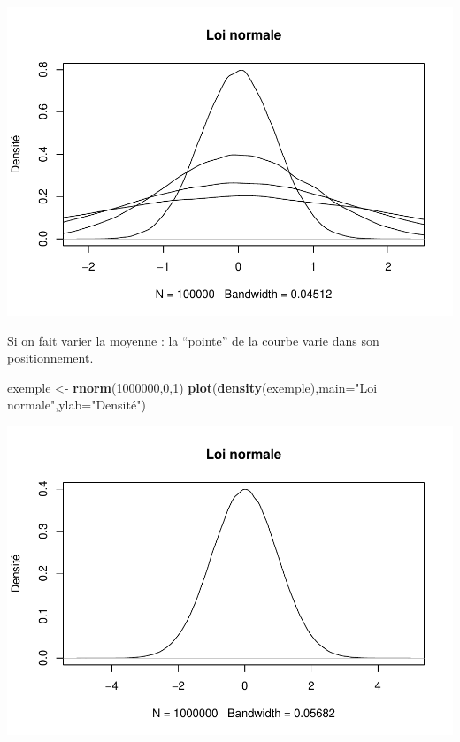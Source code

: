 \documentclass[
]{book}
\newenvironment{Shaded}{\begin{snugshade}}{\end{snugshade}}
\newcommand{\AttributeTok}[1]{\textcolor[rgb]{0.13,0.29,0.53}{#1}}
\newcommand{\DecValTok}[1]{\textcolor[rgb]{0.00,0.00,0.81}{#1}}
\newcommand{\FunctionTok}[1]{\textcolor[rgb]{0.13,0.29,0.53}{\textbf{#1}}}
\newcommand{\NormalTok}[1]{#1}
\newcommand{\OtherTok}[1]{\textcolor[rgb]{0.56,0.35,0.01}{#1}}
\newcommand{\StringTok}[1]{\textcolor[rgb]{0.31,0.60,0.02}{#1}}
\begin{document}
\includegraphics{_main_files/figure-latex/unnamed-chunk-4-1.pdf}

Si on fait varier la moyenne : la ``pointe'' de la courbe varie dans son
positionnement.

\begin{Shaded}
\begin{Highlighting}[]
\NormalTok{exemple }\OtherTok{\textless{}{-}} \FunctionTok{rnorm}\NormalTok{(}\DecValTok{1000000}\NormalTok{,}\DecValTok{0}\NormalTok{,}\DecValTok{1}\NormalTok{)}
\FunctionTok{plot}\NormalTok{(}\FunctionTok{density}\NormalTok{(exemple),}\AttributeTok{main=}\StringTok{"Loi normale"}\NormalTok{,}\AttributeTok{ylab=}\StringTok{"Densité"}\NormalTok{)}
\end{Highlighting}
\end{Shaded}

\includegraphics{_main_files/figure-latex/unnamed-chunk-5-1.pdf}
\end{document}
